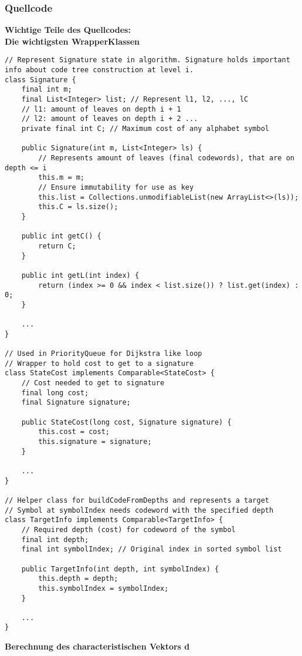 \documentclass[a4paper,10pt,ngerman]{scrartcl}
\begin{document}
\subsubsection{Quellcode}
\textbf{Wichtige Teile des Quellcodes:}
\\\newline
\textbf{Die wichtigsten WrapperKlassen}
\begin{lstlisting}
// Represent Signature state in algorithm. Signature holds important info about code tree construction at level i. 
class Signature {
    final int m;
    final List<Integer> list; // Represent l1, l2, ..., lC
    // l1: amount of leaves on depth i + 1
    // l2: amount of leaves on depth i + 2 ...
    private final int C; // Maximum cost of any alphabet symbol

    public Signature(int m, List<Integer> ls) {
        // Represents amount of leaves (final codewords), that are on depth <= i
        this.m = m;
        // Ensure immutability for use as key
        this.list = Collections.unmodifiableList(new ArrayList<>(ls));
        this.C = ls.size();
    }

    public int getC() {
        return C;
    }

    public int getL(int index) {
        return (index >= 0 && index < list.size()) ? list.get(index) : 0;
    }

    ...
}

// Used in PriorityQueue for Dijkstra like loop
// Wrapper to hold cost to get to a signature
class StateCost implements Comparable<StateCost> {
    // Cost needed to get to signature
    final long cost;
    final Signature signature;

    public StateCost(long cost, Signature signature) {
        this.cost = cost;
        this.signature = signature;
    }

    ...
}

// Helper class for buildCodeFromDepths and represents a target
// Symbol at symbolIndex needs codeword with the specified depth
class TargetInfo implements Comparable<TargetInfo> {
    // Required depth (cost) for codeword of the symbol
    final int depth;
    final int symbolIndex; // Original index in sorted symbol list

    public TargetInfo(int depth, int symbolIndex) {
        this.depth = depth;
        this.symbolIndex = symbolIndex;
    }

    ...
}
\end{lstlisting}
\textbf{Berechnung des characteristischen Vektors d}
\end{document}
